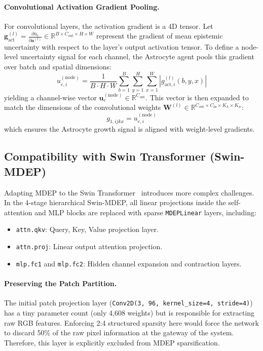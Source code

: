 \documentclass[letterpaper]{article} %
\newcommand{\R}{\mathbb{R}}
\begin{document}
\paragraph{Convolutional Activation Gradient Pooling.}
For convolutional layers, the activation gradient is a 4D tensor. Let $\bm{g}_{\text{act}}^{(l)} = \frac{\partial \bar{u}_e}{\partial \bm{a}^{(l)}} \in \R^{B \times C_{\text{out}} \times H \times W}$ represent the gradient of mean epistemic uncertainty with respect to the layer's output activation tensor. To define a node-level uncertainty signal for each channel, the Astrocyte agent pools this gradient over batch and spatial dimensions:
\begin{equation}\label{eq:conv_pooling}
    u_{e,i}^{(\text{node})} = \frac{1}{B \cdot H \cdot W} \sum_{b=1}^B \sum_{y=1}^H \sum_{x=1}^W \left| g_{\text{act}, i}^{(l)}(b, y, x) \right|
\end{equation}
yielding a channel-wise vector $\bm{u}_e^{(\text{node})} \in \R^{C_{\text{out}}}$. This vector is then expanded to match the dimensions of the convolutional weights $\bm{W}^{(l)} \in \R^{C_{\text{out}} \times C_{\text{in}} \times K_h \times K_w}$:
\begin{equation}
    g_{1, ijkx} = u_{e,i}^{(\text{node})}
\end{equation}
which ensures the Astrocyte growth signal is aligned with weight-level gradients.

\subsection{Compatibility with Swin Transformer (Swin-MDEP)}\label{subsec:swin}

Adapting MDEP to the Swin Transformer~\cite{liu2021swin, liu2022swinv2} introduces more complex challenges. In the 4-stage hierarchical Swin-MDEP, all linear projections inside the self-attention and MLP blocks are replaced with sparse \texttt{MDEPLinear} layers, including:
\begin{itemize}
    \item \texttt{attn.qkv}: Query, Key, Value projection layer.
    \item \texttt{attn.proj}: Linear output attention projection.
    \item \texttt{mlp.fc1} and \texttt{mlp.fc2}: Hidden channel expansion and contraction layers.
\end{itemize}

\paragraph{Preserving the Patch Partition.}
The initial patch projection layer (\texttt{Conv2D(3, 96, kernel\_size=4, stride=4)}) has a tiny parameter count (only 4,608 weights) but is responsible for extracting raw RGB features. Enforcing 2:4 structured sparsity here would force the network to discard 50\% of the raw pixel information at the gateway of the system. Therefore, this layer is explicitly excluded from MDEP sparsification.
\end{document}
